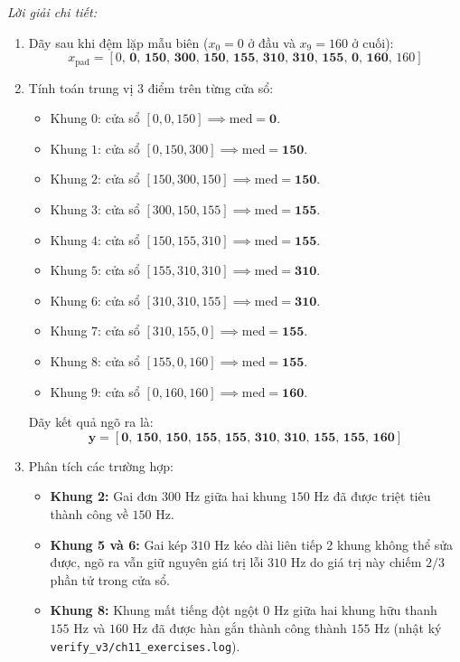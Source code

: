 \textit{Lời giải chi tiết:}
\begin{enumerate}[label=(\alph*)]
    \item Dãy sau khi đệm lặp mẫu biên ($x_0 = 0$ ở đầu và $x_9 = 160$ ở cuối):
    \begin{equation*}
        x_{\text{pad}} = [0,\, \mathbf{0,\, 150,\, 300,\, 150,\, 155,\, 310,\, 310,\, 155,\, 0,\, 160},\, 160]
    \end{equation*}
    \item Tính toán trung vị 3 điểm trên từng cửa sổ:
    \begin{itemize}
        \item Khung $0$: cửa sổ $[0, 0, 150] \implies \text{med} = \mathbf{0}$.
        \item Khung $1$: cửa sổ $[0, 150, 300] \implies \text{med} = \mathbf{150}$.
        \item Khung $2$: cửa sổ $[150, 300, 150] \implies \text{med} = \mathbf{150}$.
        \item Khung $3$: cửa sổ $[300, 150, 155] \implies \text{med} = \mathbf{155}$.
        \item Khung $4$: cửa sổ $[150, 155, 310] \implies \text{med} = \mathbf{155}$.
        \item Khung $5$: cửa sổ $[155, 310, 310] \implies \text{med} = \mathbf{310}$.
        \item Khung $6$: cửa sổ $[310, 310, 155] \implies \text{med} = \mathbf{310}$.
        \item Khung $7$: cửa sổ $[310, 155, 0] \implies \text{med} = \mathbf{155}$.
        \item Khung $8$: cửa sổ $[155, 0, 160] \implies \text{med} = \mathbf{155}$.
        \item Khung $9$: cửa sổ $[0, 160, 160] \implies \text{med} = \mathbf{160}$.
    \end{itemize}
    Dãy kết quả ngõ ra là:
    \begin{equation*}
        \mathbf{y = [0,\, 150,\, 150,\, 155,\, 155,\, 310,\, 310,\, 155,\, 155,\, 160]}
    \end{equation*}
    \item Phân tích các trường hợp:
    \begin{itemize}
        \item \textbf{Khung 2:} Gai đơn $300\text{ Hz}$ giữa hai khung $150\text{ Hz}$ đã được triệt tiêu thành công về $150\text{ Hz}$.
        \item \textbf{Khung 5 và 6:} Gai kép $310\text{ Hz}$ kéo dài liên tiếp 2 khung không thể sửa được, ngõ ra vẫn giữ nguyên giá trị lỗi $310\text{ Hz}$ do giá trị này chiếm $2/3$ phần tử trong cửa sổ.
        \item \textbf{Khung 8:} Khung mất tiếng đột ngột $0\text{ Hz}$ giữa hai khung hữu thanh $155\text{ Hz}$ và $160\text{ Hz}$ đã được hàn gắn thành công thành $155\text{ Hz}$ (nhật ký \texttt{verify\_v3/ch11\_exercises.log}).
    \end{itemize}
\end{enumerate}

